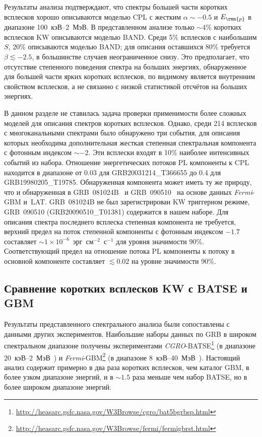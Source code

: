 

Результаты анализа подтверждают, что спектры большей части коротких всплесков хорошо
описываются моделью CPL с жестким $\alpha \sim -0.5$ и $E_\rmn{p}$ в диапазоне 100~кэВ--2~МэВ.
В представленном анализе только $\sim 4$\% коротких всплесков KW описываются моделью BAND.
Среди 5\%  всплесков с наибольшим $S$, 20\% описываются моделью BAND; для описания 
оставшихся 80\% требуется $\beta \lesssim -2.5$, в большинстве случаев неограниченное снизу.
Это предполагает, что отсутствие степенного поведения спектра на больших энергиях,
обнаруженное для большей части ярких коротких всплесков, по видимому является внутренним
свойством всплесков, а не связанно с низкой статистикой отсчётов на больших энергиях.

В данном разделе не ставилась задача проверки применимости более сложных моделей
для описания спектров коротких всплесков.
Однако, среди 214 всплесков с многоканальными спектрами было обнаружено три
события, для описания которых необходима дополнительная жесткая степенная 
спектральная компонента с фотонным индексом $\sim -2$. Эти всплески входят в 10\%
наиболее интенсивных событий из набора. Отношение энергетических потоков PL
компоненты к CPL находится в диапазоне от 0.03 для GRB20031214\_T366655 до
0.4 для GRB19980205\_T19785. Обнаруженная компонента может иметь ту же природу,
что и обнаруженная в GRB~081024B~\citep{Abdo_2010ApJ_712_558A} и 
GRB~090510~\citep{Ackermann_2010ApJ_716_1178A} на основе данных \textit{Fermi}-GBM и~LAT.
GRB~081024B не был зарегистрирован KW триггерном режиме, GRB~090510 (GRB20090510\_T01381)
содержится в нашем наборе. Для описания спектра последнего всплеска степенная 
компонента не требуется, верхний предел на поток степенной компоненты с фотонным 
индексом $-1.7$ составляет $\sim 1 \times 10^{-6}$~эрг~см$^{-2}$~с$^{-1}$ для 
уровня значимости 90\%. Соответствующий предел на отношение потока PL компоненты 
к потоку в основной компоненте составляет $\lesssim 0.02$ на уровне значимости 90\%.

\subsection{Сравнение коротких всплесков KW с BATSE и GBM}
Результаты представленного спектрального анализа были сопоставлены с данными
других экспериментов.
Наибольшие наборы данных по GRB в широком спектральном диапазоне получены экспериментами
\textit{CGRO}-BATSE\footnote{\url{http://heasarc.gsfc.nasa.gov/W3Browse/cgro/bat5bgrbsp.html}}
(в диапазоне 20~кэВ--2~МэВ~\citep{Goldstein_2013ApJS}) и 
\textit{Fermi}-GBM\footnote{\url{http://heasarc.gsfc.nasa.gov/W3Browse/fermi/fermigbrst.html}}
(в диапазоне 8~кэВ--40~МэВ~\citep{Gruber_2014ApJS}). 
Настоящий анализ содержит примерно в два раза коротких всплесков, чем каталог GBM, 
в более узком диапазоне энергий, и в $\sim 1.5 $ раза меньше чем набор BATSE, 
но в более широком диапазоне энергий.

